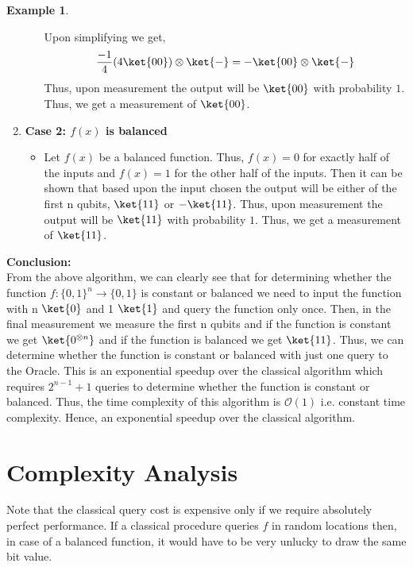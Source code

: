 \documentclass[12pt, oneside]{book}
\theoremstyle{definition}
\theoremstyle{definition}
\newtheorem{example}{Example}[section]
\theoremstyle{remark}
\begin{document}
\begin{example}
\begin{enumerate}
\begin{itemize}
\[            \]
            Upon simplifying we get,
            \[
                \frac{-1}{4}(4\ket{00})\otimes \ket{-}=-\ket{00}\otimes \ket{-}
            \]
            Thus, upon measurement the output will be $\ket{00}$ with probability $1$. Thus, we get a measurement of $\ket{00}$.
        \end{itemize}
        \item \textbf{Case 2: $f(x)$ is balanced}\\
        \begin{itemize}
            \item Let $f(x)$ be a balanced function. Thus, $f(x)=0$ for exactly half of the inputs and $f(x)=1$ for the other half of the inputs.
            Then it can be shown that based upon the input chosen the output will be either of the first n qubits, $\ket{11}$ or $-\ket{11}$.
            Thus, upon measurement the output will be $\ket{11}$ with probability $1$. Thus, we get a measurement of $\ket{11}$.
        \end{itemize}
    \end{enumerate}
\end{example}
\textbf{Conclusion: }\\
From the above algorithm, we can clearly see that for determining whether the 
function $f:\{0,1\}^n \rightarrow \{0,1\}$ is constant or balanced we need to input the function with n $\ket{0}$ and 1 $\ket{1}$ and query the function only once.
Then, in the final measurement we measure the first n qubits and if the function is constant we get $\ket{0^{\otimes n}}$ and if the function is balanced we get $\ket{11}$.
Thus, we can determine whether the function is constant or balanced with just one query to the Oracle. This is an exponential speedup over the classical algorithm which requires $2^{n-1}+1$ queries to determine whether the function is constant or balanced.
Thus, the time complexity of this algorithm is $\mathcal{O}(1)$ i.e. constant time complexity. Hence, an exponential speedup over the classical algorithm.


\section{Complexity Analysis}
Note that the classical query cost is expensive only if we require absolutely perfect performance. If a classical procedure queries $f$ in random locations then, in case of a balanced function, it would have to be very unlucky to draw the same bit value.
\end{document}
